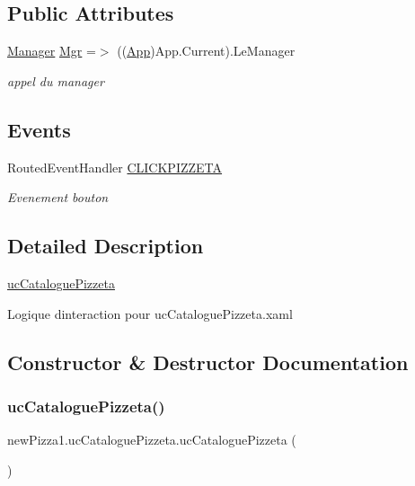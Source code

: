 \subsection*{Public Attributes}
\begin{DoxyCompactItemize}
\item 
\hyperlink{classModele_1_1Manager}{Manager} \hyperlink{classnewPizza1_1_1ucCataloguePizzeta_a272bf4809df4cc2080aca3c979521362}{Mgr} =$>$ ((\hyperlink{classnewPizza1_1_1App}{App})App.\+Current).Le\+Manager
\begin{DoxyCompactList}\small\item\em appel du manager \end{DoxyCompactList}\end{DoxyCompactItemize}
\subsection*{Events}
\begin{DoxyCompactItemize}
\item 
Routed\+Event\+Handler \hyperlink{classnewPizza1_1_1ucCataloguePizzeta_aa3f29ddf7b6144578905faf1b7e4a330}{C\+L\+I\+C\+K\+P\+I\+Z\+Z\+E\+TA}
\begin{DoxyCompactList}\small\item\em Evenement bouton \end{DoxyCompactList}\end{DoxyCompactItemize}


\subsection{Detailed Description}
\hyperlink{classnewPizza1_1_1ucCataloguePizzeta}{uc\+Catalogue\+Pizzeta} 

Logique d\textquotesingle{}interaction pour uc\+Catalogue\+Pizzeta.\+xaml 

\subsection{Constructor \& Destructor Documentation}
\mbox{\label{classnewPizza1_1_1ucCataloguePizzeta_ab0b46b46a34b1dc6f4c04db58a8c2df7}} 
\subsubsection{\texorpdfstring{uc\+Catalogue\+Pizzeta()}{ucCataloguePizzeta()}}
{\footnotesize\ttfamily new\+Pizza1.\+uc\+Catalogue\+Pizzeta.\+uc\+Catalogue\+Pizzeta (\begin{DoxyParamCaption}{ }\end{DoxyParamCaption})\hspace{0.3cm}{\ttfamily [inline]}}



